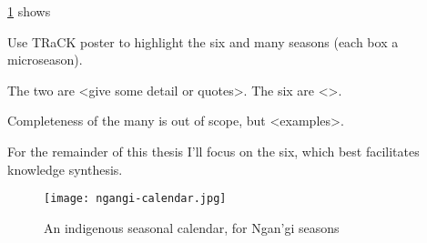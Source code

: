 \ref{fig:ngangi-seasons} shows 

Use TRaCK poster to highlight the six and many seasons (each box a microseason).

The two are <give some detail or quotes>.
The six are <>.

Completeness of the many is out of scope, but <examples>.  

For the remainder of this thesis I'll focus on the six, which best facilitates knowledge synthesis.


\begin{figure}[h]
    \centering
    \texttt{[image: ngangi-calendar.jpg]}
    \caption{An indigenous seasonal calendar, for Ngan'gi seasons \citep{CSIROcals}}
    \label{fig:ngangi-seasons}
\end{figure}

